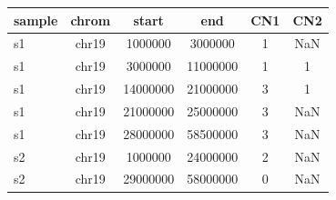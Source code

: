 \documentclass{standalone}
\begin{document}
\begin{tabular}{|l|c|c|c|c|c|}
\toprule
sample & chrom & start & end & CN1 & CN2 \\
\midrule
s1 & chr19 & 1000000 & 3000000 & 1 & NaN \\
s1 & chr19 & 3000000 & 11000000 & 1 & 1 \\
s1 & chr19 & 14000000 & 21000000 & 3 & 1 \\
s1 & chr19 & 21000000 & 25000000 & 3 & NaN \\
s1 & chr19 & 28000000 & 58500000 & 3 & NaN \\
s2 & chr19 & 1000000 & 24000000 & 2 & NaN \\
s2 & chr19 & 29000000 & 58000000 & 0 & NaN \\
\bottomrule
\end{tabular}
\end{document}
